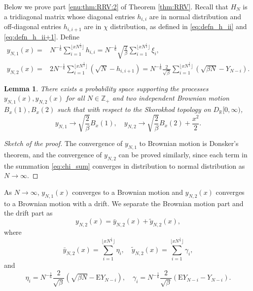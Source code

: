 \documentclass[11pt, a4paper]{article}
\numberwithin{equation}{section}
\newcommand{\E}{\mathrm{E}}
\newcommand{\realR}{\mathbb{R}}
\newcommand{\intZ}{\mathbb{Z}}
\newtheorem{lem}{Lemma}
\theoremstyle{definition}
\theoremstyle{remark}
\begin{document}
Below we prove part \ref{enu:thm:RRV:2} of Theorem \ref{thm:RRV}. Recall that $H_N$ is a tridiagonal matrix whose diagonal entries $h_{i, i}$ are in normal distribution and off-diagonal entries $h_{i, i + 1}$ are in $\chi$ distribution, as defined in \eqref{eq:defn_h_ii} and \eqref{eq:defn_h_ii+1}. Define
\begin{align}
  y_{N, 1}(x) = {}& N^{-\frac{1}{6}} \sum^{\lfloor x N^{\frac{1}{3}} \rfloor}_{i = 1} h_{i,i} = N^{-\frac{1}{6}} \sqrt{\frac{2}{\beta}} \sum^{\lfloor x N^{\frac{1}{3}} \rfloor}_{i = 1} \xi_i, \\
  y_{N, 2}(x) = {}& 2N^{-\frac{1}{6}} \sum^{\lfloor x N^{\frac{1}{3}} \rfloor}_{i = 1} (\sqrt{N} - h_{i,i + 1}) = N^{-\frac{1}{6}} \frac{2}{\sqrt{\beta}} \sum^{\lfloor x N^{\frac{1}{3}} \rfloor}_{i = 1} (\sqrt{\beta N} - Y_{N - i}). \label{eq:chi_sum}
\end{align}
\begin{lem}
  There exists a probability space supporting the processes $y_{N, 1}(x), y_{N, 2}(x)$ for all $N \in \intZ_+$ and two independent Brownian motion $B_x(1), B_x(2)$ such that with respect to the Skorokhod topology \cite[Section3.5]{Ethier-Kurtz86} on $D_{\realR}[0, \infty)$,
  \begin{equation}
    y_{N, 1} \to \sqrt{\frac{2}{\beta}} B_x(1), \quad y_{N, 2} \to \sqrt{\frac{2}{\beta}} B_x(2) + \frac{x^2}{2}.
  \end{equation}
\end{lem}
\begin{proof}[Sketch of the proof]
  The convergence of $y_{N, 1}$ to Brownian motion is Donsker's theorem, and the convergence of $y_{N, 2}$ can be proved similarly, since each term in the summation \eqref{eq:chi_sum} converges in distribution to normal distribution as $N \to \infty$.
\end{proof}
As $N \to \infty$, $y_{N, 1}(x)$ converges to a Brownian motion and $y_{N, 2}(x)$ converges to a Brownian motion with a drift. We separate the Brownian motion part and the drift part as
\begin{equation}
  y_{N, 2}(x) = \bar{y}_{N, 2}(x) + \tilde{y}_{N, 2}(x),
\end{equation}
where
\begin{equation}
  \bar{y}_{N, 2}(x) =\sum^{\lfloor x N^{\frac{1}{3}} \rfloor}_{i = 1} \eta_i, \quad \tilde{y}_{N, 2}(x) = \sum^{\lfloor x N^{\frac{1}{3}} \rfloor}_{i = 1} \gamma_i,
\end{equation}
and
\begin{equation}
  \eta_i = N^{-\frac{1}{6}} \frac{2}{\sqrt{\beta}} (\sqrt{\beta N} - \E Y_{N - i}), \quad \gamma_i = N^{-\frac{1}{6}} \frac{2}{\sqrt{\beta}} (\E Y_{N - i} - Y_{N - i}).
\end{equation}
\end{document}
